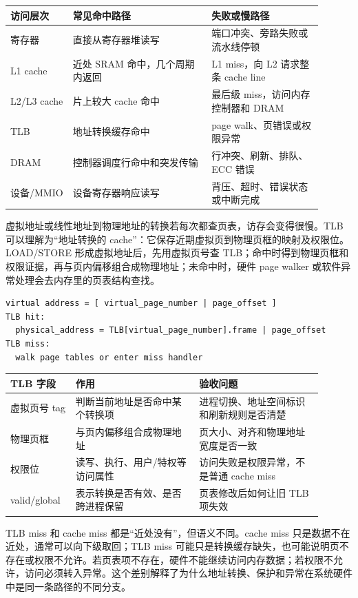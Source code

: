\begin{longtable}{L{0.18\linewidth}L{0.4\linewidth}L{0.32\linewidth}}
\toprule
访问层次 & 常见命中路径 & 失败或慢路径 \\
\midrule
寄存器 & 直接从寄存器堆读写 & 端口冲突、旁路失败或流水线停顿 \\
L1 cache & 近处 SRAM 命中，几个周期内返回 & L1 miss，向 L2 请求整条 cache line \\
L2/L3 cache & 片上较大 cache 命中 & 最后级 miss，访问内存控制器和 DRAM \\
TLB & 地址转换缓存命中 & page walk、页错误或权限异常 \\
DRAM & 控制器调度行命中和突发传输 & 行冲突、刷新、排队、ECC 错误 \\
设备/MMIO & 设备寄存器响应读写 & 背压、超时、错误状态或中断完成 \\
\bottomrule
\end{longtable}

虚拟地址或线性地址到物理地址的转换若每次都查页表，访存会变得很慢。TLB 可以理解为“地址转换的 cache”：它保存近期虚拟页到物理页框的映射及权限位。LOAD/STORE 形成虚拟地址后，先用虚拟页号查 TLB；命中时得到物理页框和权限证据，再与页内偏移组合成物理地址；未命中时，硬件 page walker 或软件异常处理会去内存里的页表结构查找。

\begin{lstlisting}
virtual address = [ virtual_page_number | page_offset ]
TLB hit:
  physical_address = TLB[virtual_page_number].frame | page_offset
TLB miss:
  walk page tables or enter miss handler
\end{lstlisting}

\begin{longtable}{L{0.18\linewidth}L{0.36\linewidth}L{0.36\linewidth}}
\toprule
TLB 字段 & 作用 & 验收问题 \\
\midrule
虚拟页号 tag & 判断当前地址是否命中某个转换项 & 进程切换、地址空间标识和刷新规则是否清楚 \\
物理页框 & 与页内偏移组合成物理地址 & 页大小、对齐和物理地址宽度是否一致 \\
权限位 & 读写、执行、用户/特权等访问属性 & 访问失败是权限异常，不是普通 cache miss \\
valid/global & 表示转换是否有效、是否跨进程保留 & 页表修改后如何让旧 TLB 项失效 \\
\bottomrule
\end{longtable}

TLB miss 和 cache miss 都是“近处没有”，但语义不同。cache miss 只是数据不在近处，通常可以向下级取回；TLB miss 可能只是转换缓存缺失，也可能说明页不存在或权限不允许。若页表项不存在，硬件不能继续访问内存数据；若权限不允许，访问必须转入异常。这个差别解释了为什么地址转换、保护和异常在系统硬件中是同一条路径的不同分支。

